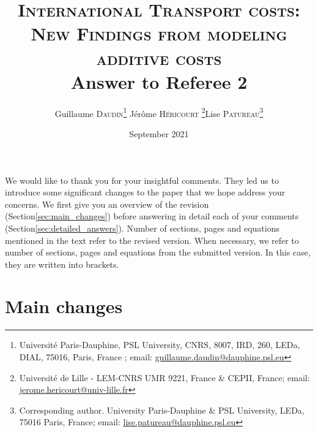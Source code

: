 \documentclass[a4paper,11pt]{article}
\begin{document}
\title{\textsc{International Transport costs:\\New Findings from modeling additive costs} \\
Answer to Referee 2}

\author{Guillaume \textsc{Daudin}\thanks{%
Université Paris-Dauphine, PSL University, CNRS, 8007, IRD, 260, LEDa, DIAL, 75016, Paris, France ; email: \url{guillaume.daudin@dauphine.psl.eu}}  \qquad J\'{e}r\^{o}me \textsc{H\'{e}ricourt} \thanks{Universit\'{e} de Lille - LEM-CNRS UMR 9221, France \& CEPII, France; email: \url{jerome.hericourt@univ-lille.fr}}\qquad Lise \textsc{Patureau}\thanks{Corresponding author.
University Paris-Dauphine \& PSL University, LEDa, 75016 Paris, France;  email: \url{lise.patureau@dauphine.psl.eu} } }


\date{September 2021}
 \maketitle
\bigskip

We would like to thank you for your insightful comments. They led us to introduce some
significant changes to the paper that we hope address your concerns. We first give you an overview
of the revision (Section\ref{sec:main_changes}) before answering in detail each of your comments (Section\ref{sec:detailed_answers}). Number of sections, pages and equations mentioned in the text refer to the revised version. When necessary, we refer to number of sections, pages and equations from the submitted version. In this case, they are written into brackets.

\section{Main changes \label{sec:main_changes}}
\end{document}
